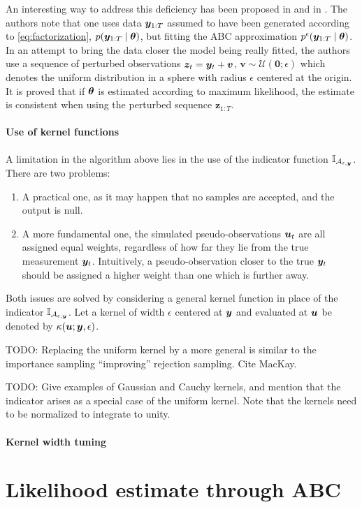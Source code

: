 An interesting way to address this deficiency has been proposed in \cite{noisy-abc1} and in \cite{noisy-abc2}. The authors note that one uses data $\bm{y}_{1:T}$ assumed to have been generated according to \eqref{eq:factorization}, $p(\bm{y}_{1:T} \mid \bm{\theta})$, but fitting the ABC approximation $p^\epsilon(\bm{y}_{1:T} \mid \bm{\theta})$. In an attempt to bring the data closer the model being really fitted, the authors use a sequence of perturbed observations $\bm{z}_t = \bm{y}_t + \bm{v}$, $\bm{v} \sim \mathcal{U}(\bm{0}; \epsilon)$ which denotes the uniform distribution in a sphere with radius $\epsilon$ centered at the origin. It is proved that if $\bm{\theta}$ is estimated according to maximum likelihood, the estimate is consistent when using the perturbed sequence $\bm{z}_{1:T}$.


\paragraph{Use of kernel functions}
A limitation in the algorithm above lies in the use of the indicator function $\mathbb{I}_{\mathcal{A}_{\epsilon, \bm{y}}}$. There are two problems:
\begin{enumerate}
    \item A practical one, as it may happen that no samples are accepted, and the output is null.
    \item A more fundamental one, the simulated pseudo-observations $\bm{u}_t$ are all assigned equal weights, regardless of how far they lie from the true measurement $\bm{y}_t$. Intuitively, a pseudo-observation closer to the true $\bm{y}_t$ should be assigned a higher weight than one which is further away.
\end{enumerate}
Both issues are solved by considering a general kernel function in place of the indicator $\mathbb{I}_{\mathcal{A}_{\epsilon, \bm{y}}}$. Let a kernel of width $\epsilon$ centered at $\bm{y}$ and evaluated at $\bm{u}$ be denoted by $\kappa(\bm{u}; \bm{y}, \epsilon)$.


{\color{red} TODO: Replacing the uniform kernel by a more general is similar to the importance sampling ``improving'' rejection sampling. Cite MacKay.}

{\color{red} TODO: Give examples of Gaussian and Cauchy kernels, and mention that the indicator arises as a special case of the uniform kernel. Note that the kernels need to be normalized to integrate to unity.}

\paragraph{Kernel width tuning}


\section{Likelihood estimate through ABC} \label{sec:abcmh}